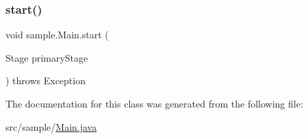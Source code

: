 \mbox{\label{classsample_1_1_main_a64ba37c898ca967654307543954cd09d}} 
\subsubsection{\texorpdfstring{start()}{start()}}
{\footnotesize\ttfamily void sample.\+Main.\+start (\begin{DoxyParamCaption}\item[{Stage}]{primary\+Stage }\end{DoxyParamCaption}) throws Exception\hspace{0.3cm}{\ttfamily [inline]}}



The documentation for this class was generated from the following file\+:\begin{DoxyCompactItemize}
\item 
src/sample/\mbox{\hyperlink{_main_8java}{Main.\+java}}\end{DoxyCompactItemize}
